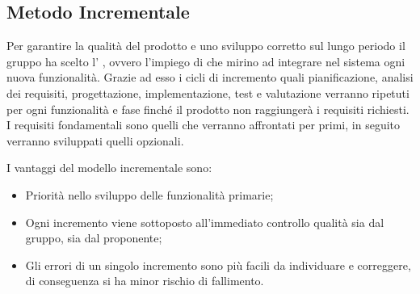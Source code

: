 \documentclass[../piano_di_progetto.tex]{subfiles}
\begin{document}
\subsection{Metodo Incrementale}
\label{sub:incr}

Per garantire la qualità del prodotto e uno sviluppo corretto sul lungo periodo il gruppo ha scelto l’ , ovvero l'impiego di  che mirino ad integrare nel sistema ogni nuova funzionalità. Grazie ad esso i cicli di incremento quali pianificazione, analisi dei requisiti, progettazione, implementazione, test e valutazione verranno ripetuti per ogni funzionalità e fase finché il prodotto non raggiungerà i requisiti richiesti. I requisiti fondamentali sono quelli che verranno affrontati per primi, in seguito verranno sviluppati quelli opzionali.

I vantaggi del modello incrementale sono:
\begin{itemize}
    \item Priorità nello sviluppo delle funzionalità primarie;
    \item Ogni incremento viene sottoposto all’immediato controllo qualità sia dal gruppo, sia dal proponente;
    \item Gli errori di un singolo incremento sono più facili da individuare e correggere, di conseguenza si ha minor rischio di fallimento.
\end{itemize}
\end{document}
